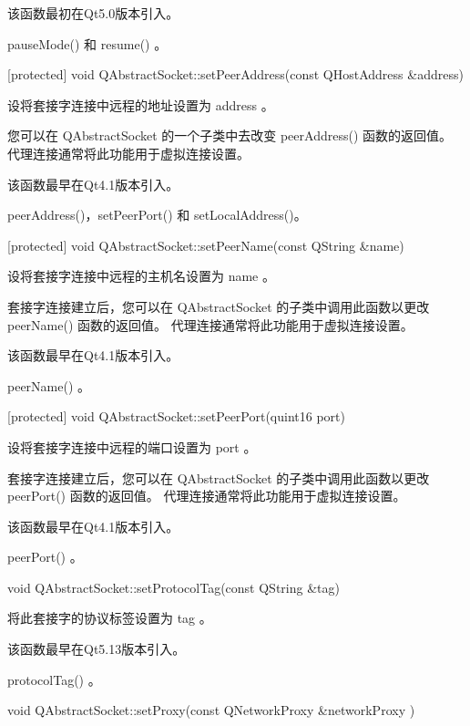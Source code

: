 该函数最初在Qt5.0版本引入。


\begin{notice}[另请查阅]
pauseMode() 和 resume() 。
\end{notice}

[protected] void QAbstractSocket::setPeerAddress(const QHostAddress
\&address)

设将套接字连接中远程的地址设置为 address 。

您可以在 QAbstractSocket 的一个子类中去改变 peerAddress() 函数的返回值。 代理连接通常将此功能用于虚拟连接设置。

该函数最早在Qt4.1版本引入。

\begin{notice}[另请查阅]
peerAddress()，setPeerPort() 和 setLocalAddress()。
\end{notice}

[protected] void QAbstractSocket::setPeerName(const QString \&name)

设将套接字连接中远程的主机名设置为 name 。

套接字连接建立后，您可以在 QAbstractSocket 的子类中调用此函数以更改 peerName() 函数的返回值。 代理连接通常将此功能用于虚拟连接设置。

该函数最早在Qt4.1版本引入。


\begin{notice}[另请查阅]
 peerName() 。
\end{notice}

[protected] void QAbstractSocket::setPeerPort(quint16 port)

设将套接字连接中远程的端口设置为 port 。

套接字连接建立后，您可以在 QAbstractSocket 的子类中调用此函数以更改 peerPort() 函数的返回值。 代理连接通常将此功能用于虚拟连接设置。

该函数最早在Qt4.1版本引入。


\begin{notice}[另请查阅]
peerPort() 。
\end{notice}

void QAbstractSocket::setProtocolTag(const QString \&tag)

将此套接字的协议标签设置为 tag 。

该函数最早在Qt5.13版本引入。


\begin{notice}[另请查阅]
protocolTag() 。
\end{notice}

void QAbstractSocket::setProxy(const QNetworkProxy \&networkProxy )

